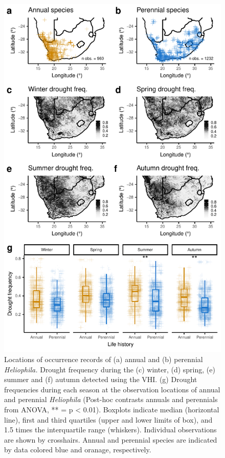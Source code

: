 \documentclass[man,floatsintext]{apa6}
\theoremstyle{definition}
\theoremstyle{definition}
\theoremstyle{definition}
\theoremstyle{remark}
\begin{document}
\begin{figure}[!h]
\includegraphics[width=\textwidth]{../figures/maps_boxplots} \caption{Locations of occurrence records of (a) annual and (b)
perennial \emph{Heliophila.} Drought frequency during the (c) winter,
(d) spring, (e) summer and (f) autumn detected using the VHI. (g)
Drought frequencies during each season at the observation locations of
annual and perennial \emph{Heliophila} (Post-hoc contrasts annuals and
perennials from ANOVA, ** = p \textless{} 0.01). Boxplots indicate
median (horizontal line), first and third quartiles (upper and lower
limits of box), and 1.5 times the interquartile range (whiskers).
Individual observations are shown by crosshairs. Annual and perennial
species are indicated by data colored blue and oranage, respectively.}\label{fig:mapsboxplots}
\end{figure}
\end{document}
